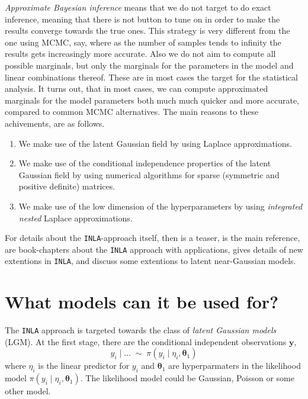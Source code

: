 \documentclass[a4paper,11pt]{report}
\newcommand{\tv}{\texttt}
\def\mm#1{\ensuremath{\boldsymbol{#1}}} %
\begin{document}
\emph{Approximate Bayesian inference} means that we do not target to
do exact inference, meaning that there is not button to tune on in
order to make the results converge towards the true ones. This
strategy is very different from the one using MCMC, say, where as the
number of samples tends to infinity the results gets increasingly more
accurate. Also we do not aim to compute all possible marginals, but
only the marginals for the parameters in the model and linear
combinations thereof. These are in most cases the target for the
statistical analysis. It turns out, that in most cases, we can compute
approximated marginals for the model parameters both much much quicker
and more accurate, compared to common MCMC alternatives. The main
reasons to these achivements, are as follows.
\begin{enumerate}
\item We make use of the latent Gaussian field by using Laplace
    approximations.
\item We make use of the conditional independence properties of the
    latent Gaussian field by using numerical algorithms for sparse
    (symmetric and positive definite) matrices.
\item We make use of the low dimension of the hyperparameters by using
    \emph{integrated nested} Laplace approximations.
\end{enumerate}
For details about the \tv{INLA}-approach itself, then \cite{art375} is
a teaser, \cite{art451} is the main reference,
\cite{col30,col33,art517} are book-chapters about the \tv{INLA}
approach with applications, \cite{tech106} gives details of new
extentions in \tv{INLA}, and \cite{tech104} discuss some extentions to
latent near-Gaussian models.

\section{What models can it be used for?}
\label{intro:2}

The \tv{INLA} approach is targeted towards the class of \emph{latent
    Gaussian models} (LGM). At the first stage, there are the
conditional independent observations $\mm{y}$,
\begin{displaymath}
    y_{i} \mid \ldots \;\sim\; \pi(y_{i} \mid \eta_{i}, \mm{\theta}_{1})
\end{displaymath}
where $\eta_{i}$ is the linear predictor for $y_{i}$ and
$\mm{\theta}_{1}$ are hyperparmaters in the likelihood model
$\pi(y_{i} \mid \eta_{i}, \mm{\theta}_{1})$. The likelihood model
could be Gaussian, Poisson or some other model. 
\end{document}
